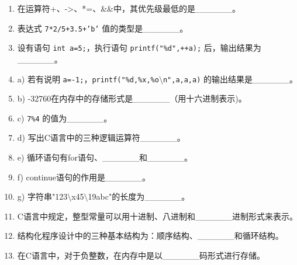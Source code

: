 \documentclass[a4paper,12pt]{article}
\begin{document}
\begin{enumerate}
	\item 在运算符+、->、*=、\&\&中，其优先级最低的是\_\_\_\_\_\_。
	      \vspace{0.3cm}

	\item 表达式 \texttt{7*2/5+3.5+'b'} 值的类型是\_\_\_\_\_\_。
	      \vspace{0.3cm}

	\item 设有语句 \texttt{int a=5;}，执行语句 \texttt{printf("\%d",++a);} 后，输出结果为\_\_\_\_\_\_。
	      \vspace{0.3cm}

	\item a) 若有说明 \texttt{a=-1;}，\texttt{printf("\%d,\%x,\%o$\setminus$n",a,a,a)} 的输出结果是\_\_\_\_\_\_。
	      \vspace{0.3cm}

	\item b) -32760在内存中的存储形式是\_\_\_\_\_\_（用十六进制表示)。
	      \vspace{0.3cm}

	\item c) \texttt{7\%4} 的值为\_\_\_\_\_\_。
	      \vspace{0.3cm}

	\item d) 写出C语言中的三种逻辑运算符\_\_\_\_\_\_。
	      \vspace{0.3cm}

	\item e) 循环语句有for语句、\_\_\_\_\_\_和\_\_\_\_\_\_。
	      \vspace{0.3cm}

	\item f) continue语句的作用是\_\_\_\_\_\_。
	      \vspace{0.3cm}

	\item g) 字符串"123$\setminus$x45$\setminus$19abc"的长度为\_\_\_\_\_\_。
	      \vspace{0.3cm}

	\item C语言中规定，整型常量可以用十进制、八进制和\_\_\_\_\_\_进制形式来表示。
	      \vspace{0.3cm}

	\item 结构化程序设计中的三种基本结构为：顺序结构、\_\_\_\_\_\_和循环结构。
	      \vspace{0.3cm}

	\item 在C语言中，对于负整数，在内存中是以\_\_\_\_\_\_码形式进行存储。
	      \vspace{0.3cm}


\end{enumerate}
\end{document}
